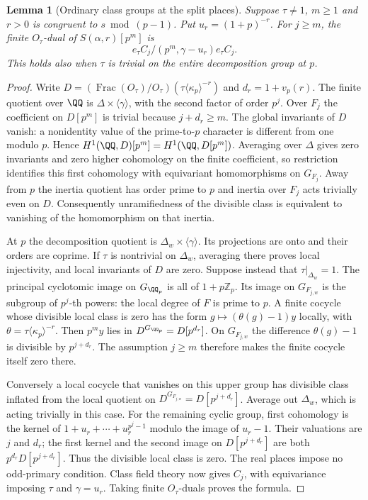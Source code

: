 \documentclass[a4paper,11pt]{article}
\newtheorem{lemma}[proposition]{Lemma}
\theoremstyle{definition}
\theoremstyle{remark}
\newcommand{\ZZ}{\mathbb Z}\newcommand{\ord}{\operatorname{ord}}
\numberwithin{equation}{section}
\begin{document}
\begin{lemma}[Ordinary class groups at the split places]
\leavevmode\label{lem:allordinary648}
Suppose \(\tau\ne1\), \(m\ge1\) and \(r>0\) is congruent
to \(s\bmod(p-1)\). Put \(u_r=(1+p)^{-r}\). For \(j\ge m\),
the finite \(O_\tau\)-dual of \(S(\alpha,r)[p^m]\) is
\[
              e_\tau C_j/(p^m,\gamma-u_r)e_\tau C_j.
\]
This holds also when \(\tau\) is trivial on the entire
decomposition group at \(p\).
\end{lemma}
\begin{proof}
Write \(D=(\operatorname{Frac}(O_\tau)/O_\tau)
(\tau\langle\kappa_p\rangle^{-r})\) and \(d_r=1+v_p(r)\).
The finite quotient over \(\QQ\) is
\(\Delta\times\langle\gamma\rangle\), with the second
factor of order \(p^j\). Over \(F_j\) the coefficient on
\(D[p^m]\) is trivial because \(j+d_r\ge m\).
The global invariants of \(D\) vanish: a nonidentity value
of the prime-to-\(p\) character is different from one modulo
\(p\). Hence \(H^1(\QQ,D)[p^m]=H^1(\QQ,D[p^m])\).
Averaging over \(\Delta\) gives zero invariants and zero
higher cohomology on the finite coefficient, so restriction
identifies this first cohomology with equivariant
homomorphisms on \(G_{F_j}\).
Away from \(p\) the inertia quotient has order prime to \(p\)
and inertia over \(F_j\) acts trivially even on \(D\).
Consequently unramifiedness of the divisible class is
equivalent to vanishing of the homomorphism on that inertia.

At \(p\) the decomposition quotient is
\(\Delta_w\times\langle\gamma\rangle\). Its projections are
onto and their orders are coprime. If \(\tau\) is nontrivial
on \(\Delta_w\), averaging there proves local injectivity,
and local invariants of \(D\) are zero. Suppose instead that
\(\tau|_{\Delta_w}=1\). The principal cyclotomic image on
\(G_{\QQ_p}\) is all of \(1+p\ZZ_p\). Its image on
\(G_{F_{j,w}}\) is the subgroup of \(p^j\)-th powers:
the local degree of \(F\) is prime to \(p\).
A finite cocycle whose divisible local class is zero has
the form \(g\mapsto(\theta(g)-1)y\) locally, with
\(\theta=\tau\langle\kappa_p\rangle^{-r}\).
Then \(p^m y\) lies in \(D^{G_{\QQ_p}}=D[p^{d_r}]\).
On \(G_{F_{j,w}}\) the difference \(\theta(g)-1\) is
divisible by \(p^{j+d_r}\). The assumption \(j\ge m\)
therefore makes the finite cocycle itself zero there.

Conversely a local cocycle that vanishes on this upper
group has divisible class inflated from the local quotient
on \(D^{G_{F_{j,w}}}=D[p^{j+d_r}]\). Average out
\(\Delta_w\), which is acting trivially in this case.
For the remaining cyclic group, first cohomology is the
kernel of \(1+u_r+\cdots+u_r^{p^j-1}\) modulo the image
of \(u_r-1\). Their valuations are \(j\) and \(d_r\);
the first kernel and the second image on \(D[p^{j+d_r}]\)
are both \(p^{d_r}D[p^{j+d_r}]\). Thus the divisible local
class is zero. The real places impose no odd-primary
condition. Class field theory now gives \(C_j\), with
equivariance imposing \(\tau\) and \(\gamma=u_r\).
Taking finite \(O_\tau\)-duals proves the formula.
\end{proof}
\end{document}

